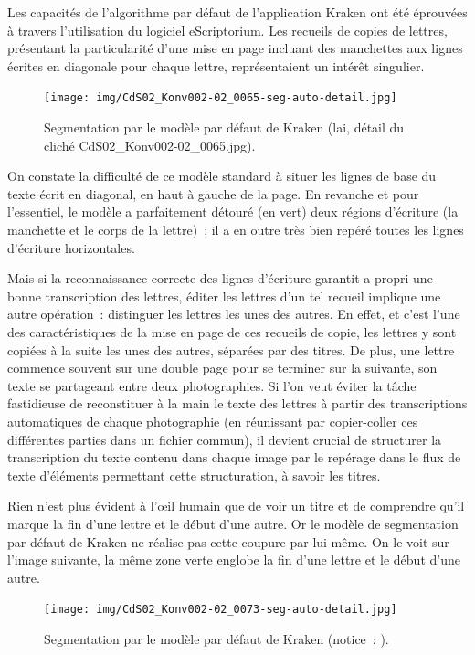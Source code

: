 \documentclass[a4paper,12pt,twoside]{book}
\begin{document}
				Les capacités de l'algorithme par défaut de l'application Kraken ont été éprouvées à travers l'utilisation du logiciel eScriptorium. Les recueils de copies de lettres, présentant la particularité d'une mise en page incluant des manchettes aux lignes écrites en diagonale pour chaque lettre, représentaient un intérêt singulier.
				
				\begin{figure}[!h]
					\centering
					\texttt{[image: img/CdS02\_Konv002-02\_0065-seg-auto-detail.jpg]}
					\caption{Segmentation par le modèle par défaut de Kraken (\gls{lai}, détail du cliché CdS02\_Konv002-02\_0065.jpg).}
					\label{seg-defaut-65}
				\end{figure}
			
				On constate la difficulté de ce modèle standard à situer les lignes de base du texte écrit en diagonal, en haut à gauche de la page. En revanche et pour l'essentiel, le modèle a parfaitement détouré (en vert) deux régions d'écriture (la manchette et le corps de la lettre)~; il a en outre très bien repéré toutes les lignes d'écriture horizontales.
				
				Mais si la reconnaissance correcte des lignes d'écriture garantit a propri une bonne transcription des lettres, éditer les lettres d'un tel recueil implique une autre opération~: distinguer les lettres les unes des autres. En effet, et c'est l'une des caractéristiques de la mise en page de ces recueils de copie, les lettres y sont copiées à la suite les unes des autres, séparées par des titres. De plus, une lettre commence souvent sur une double page pour se terminer sur la suivante, son texte se partageant entre deux photographies. Si l'on veut éviter la tâche fastidieuse de reconstituer à la main le texte des lettres à partir des transcriptions automatiques de chaque photographie (en réunissant par copier-coller ces différentes parties dans un fichier commun), il devient crucial de structurer la transcription du texte contenu dans chaque image par le repérage dans le flux de texte d'éléments permettant cette structuration, à savoir les titres.
				
				Rien n'est plus évident à l'œil humain que de voir un titre et de comprendre qu'il marque la fin d'une lettre et le début d'une autre. Or le modèle de {segmentation} par défaut de Kraken ne réalise pas cette coupure par lui-même. On le voit sur l'image suivante, la même zone verte englobe la fin d'une lettre et le début d'une autre.
				
				\begin{figure}[!h]
					\centering
					\texttt{[image: img/CdS02\_Konv002-02\_0073-seg-auto-detail.jpg]}
					\caption{Segmentation par le modèle par défaut de Kraken (notice~: \cite{CdS02073}).}
					\label{}
				\end{figure}
				
\end{document}
